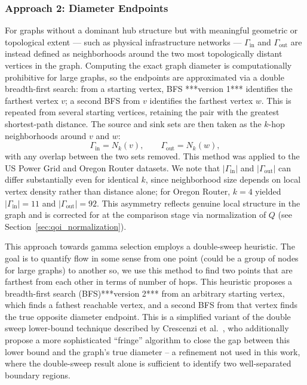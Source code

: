 \documentclass[a4paper,12pt]{amsart}
\numberwithin{equation}{section}
\begin{document}
\subsubsection{Approach 2: Diameter Endpoints}

For graphs without a dominant hub structure but with meaningful 
geometric or topological extent — such as physical infrastructure 
networks — $\Gamma_{\text{in}}$ and $\Gamma_{\text{out}}$ are instead 
defined as neighborhoods around the two most topologically distant 
vertices in the graph. Computing the exact graph diameter is 
computationally prohibitive for large graphs, so the endpoints are 
approximated via a double breadth-first search: from a starting vertex, 
BFS ***version 1*** identifies the farthest vertex $v$; a second BFS from $v$ identifies 
the farthest vertex $w$. This is repeated from several starting 
vertices, retaining the pair with the greatest shortest-path distance. 
The source and sink sets are then taken as the $k$-hop neighborhoods 
around $v$ and $w$:
\begin{equation}
\Gamma_{\text{in}} = N_k(v), \qquad \Gamma_{\text{out}} = N_k(w),
\end{equation}
with any overlap between the two sets removed. This method was applied 
to the US Power Grid and Oregon Router datasets. We note that 
$|\Gamma_{\text{in}}|$ and $|\Gamma_{\text{out}}|$ can differ 
substantially even for identical $k$, since neighborhood size depends 
on local vertex density rather than distance alone; for Oregon Router, 
$k=4$ yielded $|\Gamma_{\text{in}}| = 11$ and $|\Gamma_{\text{out}}| = 92$. 
This asymmetry reflects genuine local structure in the graph and is 
corrected for at the comparison stage via normalization of $Q$ (see 
Section~\ref{sec:qoi_normalization}).

This approach towards gamma selection employs a double-sweep heuristic. The goal is to quantify flow in some sense from one point (could be a group of nodes for large graphs) to another so, we use this method to find two points that are farthest from each other in terms of number of hops. This heuristic proposes a breadth-first search (BFS)***version 2*** from an arbitrary starting vertex, which finds a fathest reachable vertex, and a second BFS from that vertex finds the true opposite diameter endpoint. This is a simplified variant of the double sweep lower-bound technique described by Crescenzi et 
al.~\citep{crescenzi2010finding}, who additionally propose a more 
sophisticated ``fringe'' algorithm to close the gap between this 
lower bound and the graph's true diameter -- a refinement not used in 
this work, where the double-sweep result alone is sufficient to 
identify two well-separated boundary regions.
\end{document}
